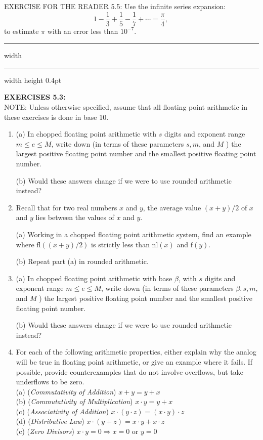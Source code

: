 \documentclass[../main.tex]{subfiles}
\begin{document}
EXERCISE FOR THE READER 5.5: Use the infinite series expansion:
$$
1-\frac{1}{3}+\frac{1}{5}-\frac{1}{7}+\cdots=\frac{\pi}{4} \text {, }
$$
to estimate $\pi$ with an error less than $10^{-7}$.\\

\hrule width \hsize \kern 1pt \hrule width \hsize height 0.4pt

\hspace{0.1cm}

\textbf{EXERCISES 5.3: }\\

NOTE: Unless otherwise specified, assume that all floating point arithmetic in these exercises is done in base 10.

\begin{enumerate}

\item (a) In chopped floating point arithmetic with $s$ digits and exponent range $m \leq e \leq M$, write down (in terms of these parameters $s, m$, and $M$ ) the largest positive floating point number and the smallest positive floating point number.

(b) Would these answers change if we were to use rounded arithmetic instead?

\item Recall that for two real numbers $x$ and $y$, the average value $(x+y) / 2$ of $x$ and $y$ lies between the values of $x$ and $y$.
 
(a) Working in a chopped floating point arithmetic system, find an example where $\mathrm{fl}((x+y) / 2)$ is strictly less than $\mathrm{nl}(x)$ and $\mathrm{f}(y)$.

(b) Repeat part (a) in rounded arithmetic.

\item (a) In chopped floating point arithmetic with base $\beta$, with $s$ digits and exponent range $m \leq e \leq M$, write down (in terms of these parameters $\beta, s, m$, and $M$ ) the largest positive floating point number and the smallest positive floating point number.

(b) Would these answers change if we were to use rounded arithmetic instead?

\item For each of the following arithmetic properties, either explain why the analog will be true in floating point arithmetic, or give an example where it fails. If possible, provide counterexamples that do not involve overflows, but take underflows to be zero.\\
(a) (\emph{Commutativity of Addition}) $x+y=y+x$\\
(b) (\emph{Commutativity of Multiplication}) $x \cdot y=y+x$\\
(c) (\emph{Associativity of Addition}) $x \cdot(y \cdot z)=(x \cdot y) \cdot z$\\
(d) (\emph{Distributive Law}) $x \cdot(y+z)=x \cdot y+x \cdot z$\\
(c) (\emph{Zero Divisors}) $x \cdot y=0 \Rightarrow x=0$ or $y=0$


\end{enumerate}
\end{document}
